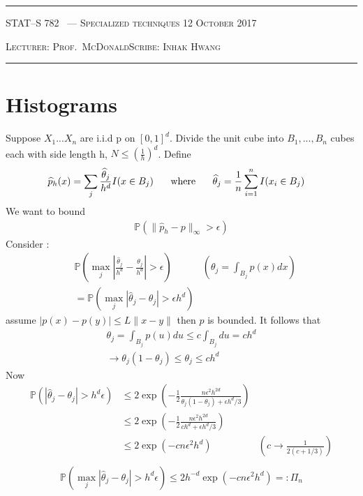 \documentclass[10pt]{article}
\newcounter{lecnum}
\renewcommand{\P}{\mathbb{P}}
\renewcommand{\hat}{\widehat}
\newcommand{\lecturer}{Prof.\ McDonald}
\newcommand{\scribe}{Inhak Hwang}
\newcommand{\chtitle}{Specialized techniques}
\newcommand{\lecdate}{12 October 2017}
\begin{document}
\rule{6.5in}{1pt}

\textsc{STAT--S 782
        \hfill \thelecnum\ --- \chtitle
        \hfill \lecdate}

\textsc{Lecturer: \lecturer \hfill Scribe: \scribe}
\rule{6.5in}{1pt}

\section{Histograms}
Suppose $X_{1}...X_{n}$ are i.i.d p on $[0,1]^{d}$. Divide the unit cube into $B_{1},...,B_{n}$ cubes each with side length h, $N \le (\frac{1}{h})^{d}$. 
Define 
\begin{align*}
&\hat{p}_{h}(x) = \sum\limits_{j}\frac{\hat{\theta}_{j}}{h^{d}}I(x \in B_{j}) \text{\hspace{0.5cm}  where  \hspace{0.5cm}} \hat{\theta}_{j} = \frac{1}{n}\sum_{i=1}^{n}I(x_{i} \in B_{j})
\end{align*}
We want to bound
\begin{align*}
\P\left(\| \hat{p}_{h} - p \|_{\infty} > \epsilon \right) 
\end{align*}
Consider :
\begin{align*}
&\P\left(\max\limits_{j}\left|\frac{\hat{\theta}_{j}}{h^{d}} - \frac{\theta_{j}}{h^{d}}\right| > \epsilon\right) 
 & \left(\theta_{j} = \int_{B_{j}}p(x)dx \right) \\
&= \P\left(\max\limits_{j}\left|\hat{\theta}_{j} - \theta_{j}\right| > \epsilon h^{d}\right) 
\end{align*}
assume $|p(x) - p(y) | \le L\|x - y\|$ then $p$ is bounded. 
It follows that
\begin{align*}
\theta_{j} = \int_{B_{j}}p(u)du \le c\int_{B_{j}}du = ch^{d} \\
\rightarrow \theta_{j}(1 - \theta_{j}) \le \theta_{j} \le ch^{d}
\end{align*}
Now
\begin{align*}
\P\left(\left|\hat{\theta}_{j} - \theta_{j}\right| > h^{d}\epsilon\right) &\le 2\exp\left(-\frac{1}{2}\frac{n\epsilon^{2}h^{2d}}{\theta_{j}(1-\theta_{j}) + \epsilon h^{d} / 3}\right) \\
&\le 2\exp\left(-\frac{1}{2}\frac{n\epsilon^{2}h^{2d}}{ch^{d}+ \epsilon h^{d} /3}\right) \\
&\le 2\exp\left(-c n \epsilon^{2} h^{d}\right) 
& \left(c \rightarrow \frac{1}{2(c+1/3)}\right) \\
\end{align*}
\begin{align*}
\P\left(\max\limits_{j}|\hat{\theta}_{j} - \theta_{j}| > h^{d}\epsilon\right) \le 2 h^{-d}\exp\left(-cn\epsilon^{2}h^{d}\right) =: \Pi_{n}
\end{align*}
\end{document}
